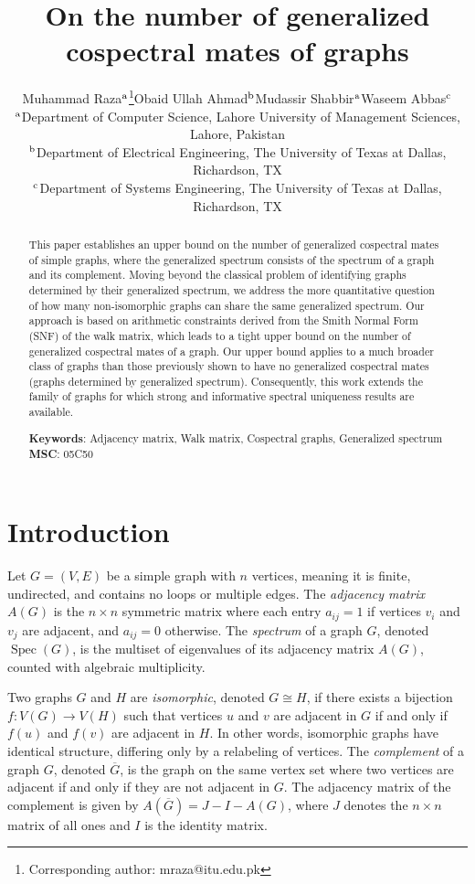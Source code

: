 \documentclass[12pt]{article}
\title{On the number of generalized cospectral mates of graphs}
\author{\small Muhammad Raza$^{{\rm a}}$\thanks{Corresponding author: mraza@itu.edu.pk}\quad\quad Obaid Ullah Ahmad$^{\rm b}$\quad\quad Mudassir Shabbir$^{\rm a}$\quad\quad Waseem Abbas$^{{\rm c}}$
\\
{\footnotesize$^{\rm a}$Department of Computer Science, Lahore University of Management Sciences, Lahore, Pakistan}\\
{\footnotesize$^{\rm b}$Department of Electrical Engineering, The University of Texas at Dallas, Richardson, TX}\\
{\footnotesize$^{\rm c}$Department of Systems Engineering, The University of Texas at Dallas, Richardson, TX
}
}
\date{}
\theoremstyle{plain}
\theoremstyle{definition}
\begin{document}
\maketitle

\begin{abstract}

This paper establishes an upper bound on the number of generalized cospectral mates of simple graphs, where the generalized spectrum consists of the spectrum of a graph and its complement. Moving beyond the classical problem of identifying graphs determined by their generalized spectrum, we address the more quantitative question of how many non-isomorphic graphs can share the same generalized spectrum. Our approach is based on arithmetic constraints derived from the Smith Normal Form (SNF) of the walk matrix, which leads to a tight upper bound on the number of generalized cospectral mates of a graph. Our upper bound applies to a much broader class of graphs than those previously shown to have no generalized cospectral mates (graphs determined by generalized spectrum). Consequently, this work extends the family of graphs for which strong and informative spectral uniqueness results are available.

\noindent\textbf{Keywords}: Adjacency matrix, Walk matrix, Cospectral graphs, Generalized spectrum
\noindent\textbf{MSC}: 05C50
\end{abstract}


\section{Introduction}
\label{section:intro}
Let $G = (V, E)$ be a simple graph with $n$ vertices, meaning it is finite, undirected, and contains no loops or multiple edges. The \emph{adjacency matrix} $A(G)$ is the $n \times n$ symmetric matrix where each entry $a_{ij} = 1$ if vertices $v_i$ and $v_j$ are adjacent, and $a_{ij} = 0$ otherwise. The \emph{spectrum} of a graph $G$, denoted $\operatorname{Spec}(G)$, is the multiset of eigenvalues of its adjacency matrix $A(G)$, counted with algebraic multiplicity.

Two graphs $G$ and $H$ are \emph{isomorphic}, denoted $G \cong H$, if there exists a bijection $f: V(G) \to V(H)$ such that vertices $u$ and $v$ are adjacent in $G$ if and only if $f(u)$ and $f(v)$ are adjacent in $H$. In other words, isomorphic graphs have identical structure, differing only by a relabeling of vertices. The \emph{complement} of a graph $G$, denoted $\overline{G}$, is the graph on the same vertex set where two vertices are adjacent if and only if they are not adjacent in $G$. The adjacency matrix of the complement is given by $A(\overline{G}) = J - I - A(G)$, where $J$ denotes the $n \times n$ matrix of all ones and $I$ is the identity matrix.
\end{document}
